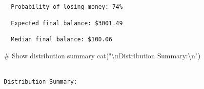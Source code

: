 \documentclass[
  letterpaper,
  DIV=11,
  numbers=noendperiod]{scrartcl}
\newenvironment{Shaded}{\begin{snugshade}}{\end{snugshade}}
\newcommand{\AttributeTok}[1]{\textcolor[rgb]{0.40,0.45,0.13}{#1}}
\newcommand{\CommentTok}[1]{\textcolor[rgb]{0.37,0.37,0.37}{#1}}
\newcommand{\DecValTok}[1]{\textcolor[rgb]{0.68,0.00,0.00}{#1}}
\newcommand{\FunctionTok}[1]{\textcolor[rgb]{0.28,0.35,0.67}{#1}}
\newcommand{\NormalTok}[1]{\textcolor[rgb]{0.00,0.23,0.31}{#1}}
\newcommand{\SpecialCharTok}[1]{\textcolor[rgb]{0.37,0.37,0.37}{#1}}
\newcommand{\StringTok}[1]{\textcolor[rgb]{0.13,0.47,0.30}{#1}}
\begin{document}
\begin{verbatim}
  Probability of losing money: 74%
\end{verbatim}

\begin{Shaded}
\end{Shaded}

\begin{verbatim}
  Expected final balance: $3001.49
\end{verbatim}

\begin{Shaded}
\end{Shaded}

\begin{verbatim}
  Median final balance: $100.06
\end{verbatim}

\begin{Shaded}
\begin{Highlighting}[]
\CommentTok{\# Show distribution summary}
\FunctionTok{cat}\NormalTok{(}\StringTok{"}\SpecialCharTok{\textbackslash{}n}\StringTok{Distribution Summary:}\SpecialCharTok{\textbackslash{}n}\StringTok{"}\NormalTok{)}
\end{Highlighting}
\end{Shaded}

\begin{verbatim}

Distribution Summary:
\end{verbatim}

\begin{Shaded}
\end{Shaded}
\end{document}
